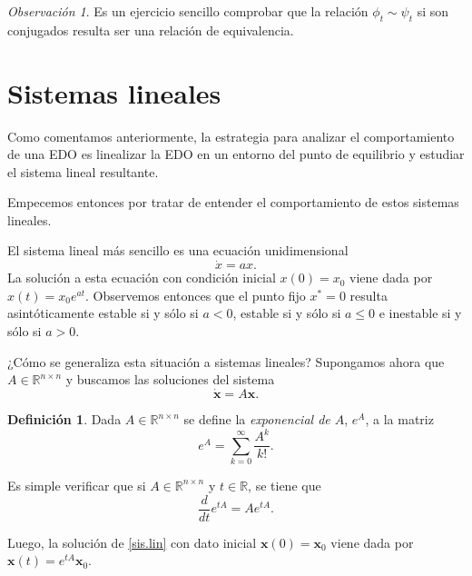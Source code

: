 \documentclass[12pt, a4paper]{amsbook}
\newcommand{\R}{{\mathbb R}}
\newcommand{\xx}{{\mathbf x}}
\theoremstyle{remark}
\newtheorem{obs}[teo]{Observación}
\theoremstyle{definition}
\newtheorem{defi}[teo]{Definición}
\numberwithin{section}{chapter}
\numberwithin{subsection}{section}
\numberwithin{equation}{section}
\numberwithin{figure}{chapter}
\begin{document}
\begin{obs}
Es un ejercicio sencillo comprobar que la relación $\phi_t\sim\psi_t$ si son conjugados resulta ser una relación de equivalencia.
\end{obs}

\section{Sistemas lineales}

Como comentamos anteriormente, la estrategia para analizar el comportamiento de una EDO es linealizar la EDO en un entorno del punto de equilibrio y estudiar el sistema lineal resultante.

Empecemos entonces por tratar de entender el comportamiento de estos sistemas lineales.

El sistema lineal más sencillo es una ecuación unidimensional
$$
\dot x = ax.
$$
La solución a esta ecuación con condición inicial $x(0)=x_0$ viene dada por $x(t)=x_0 e^{at}$. Observemos entonces que el punto fijo $x^*=0$ resulta asintóticamente estable si y sólo si $a<0$, estable si y sólo si $a\le 0$ e inestable si y sólo si $a>0$.

¿Cómo se generaliza esta situación a sistemas lineales? Supongamos ahora que $A\in \R^{n\times n}$ y buscamos las soluciones del sistema
\begin{equation}\label{sis.lin}
\dot\xx = A\xx.
\end{equation}
\begin{defi}
Dada $A\in\R^{n\times n}$ se define la {\em exponencial de $A$}, $e^A$, a la matriz
$$
e^A = \sum_{k=0}^\infty \frac{A^k}{k!}.
$$
\end{defi}

Es simple verificar que si $A\in \R^{n\times n}$ y $t\in \R$, se tiene que
$$
\frac{d}{dt} e^{tA} = Ae^{tA}.
$$

Luego, la solución de \eqref{sis.lin} con dato inicial $\xx(0)=\xx_0$ viene dada por $\xx(t) = e^{tA}\xx_0$.
\end{document}

